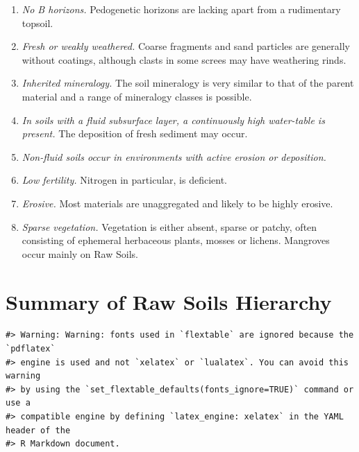 \documentclass[
  letterpaper,
  DIV=11,
  numbers=noendperiod]{scrreprt}
\providecommand{\tightlist}{%
  \setlength{\itemsep}{0pt}\setlength{\parskip}{0pt}}\usepackage{longtable,booktabs,array}
\begin{document}
\begin{enumerate}
\def\labelenumi{\arabic{enumi}.}
\tightlist
\item
  \emph{No B horizons.} Pedogenetic horizons are lacking apart from a
  rudimentary topsoil.
\item
  \emph{Fresh or weakly weathered.} Coarse fragments and sand particles
  are generally without coatings, although clasts in some screes may
  have weathering rinds.
\item
  \emph{Inherited mineralogy.} The soil mineralogy is very similar to
  that of the parent material and a range of mineralogy classes is
  possible.
\item
  \emph{In soils with a fluid subsurface layer, a continuously high
  water-table is present.} The deposition of fresh sediment may occur.
\item
  \emph{Non-fluid soils occur in environments with active erosion or
  deposition.}
\item
  \emph{Low fertility.} Nitrogen in particular, is deficient.
\item
  \emph{Erosive.} Most materials are unaggregated and likely to be
  highly erosive.
\item
  \emph{Sparse vegetation.} Vegetation is either absent, sparse or
  patchy, often consisting of ephemeral herbaceous plants, mosses or
  lichens. Mangroves occur mainly on Raw Soils.
\end{enumerate}

\hypertarget{sec-sum-W}{%
\section{Summary of Raw Soils Hierarchy}\label{sec-sum-W}}

\begin{verbatim}
#> Warning: Warning: fonts used in `flextable` are ignored because the `pdflatex`
#> engine is used and not `xelatex` or `lualatex`. You can avoid this warning
#> by using the `set_flextable_defaults(fonts_ignore=TRUE)` command or use a
#> compatible engine by defining `latex_engine: xelatex` in the YAML header of the
#> R Markdown document.
\end{verbatim}

\providecommand{\docline}[3]{\noalign{\global\setlength{\arrayrulewidth}{#1}}\arrayrulecolor[HTML]{#2}\cline{#3}}

\setlength{\tabcolsep}{2pt}

\renewcommand*{\arraystretch}{1.5}
\end{document}
